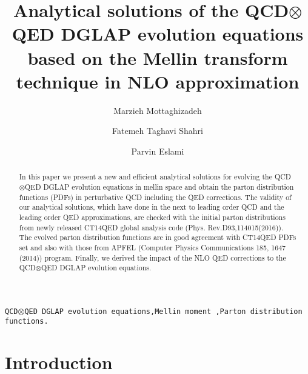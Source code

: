 \documentclass[review]{elsarticle}
\begin{document}
\begin{frontmatter}

\title{Analytical solutions of the QCD$\otimes$QED DGLAP evolution equations based on the Mellin transform technique in NLO approximation}




\author[mymainaddress]{Marzieh Mottaghizadeh}


\author[mymainaddress]{Fatemeh Taghavi Shahri}

\author[mymainaddress]{Parvin Eslami}

\address[mymainaddress]{Department of Physics, Ferdowsi University of Mashhad,
Mashhad, Iran}


\begin{abstract}

In this paper we present a new and efficient analytical solutions for evolving the QCD$\otimes$QED
DGLAP evolution equations in mellin space and obtain the parton distribution functions
(PDFs) in perturbative QCD including the QED corrections. The validity of our analytical solutions, which have done in the next to leading order QCD and the leading order QED approximations, are checked with the initial parton distributions from newly released CT14QED global analysis code (Phys. Rev.D93,114015(2016)). The evolved parton distribution functions are in good agreement with  CT14QED PDFs set and also with those from APFEL (Computer Physics Communications 185, 1647 (2014)) program. Finally, we derived the impact of the NLO QED corrections to the QCD$\otimes$QED DGLAP evolution equations.

\end{abstract}

\begin{keyword}
\texttt{QCD$\otimes$QED DGLAP evolution equations\sep Mellin moment \sep Parton distribution functions.}

\end{keyword}

\end{frontmatter}

\linenumbers


\section{Introduction }
\end{document}
